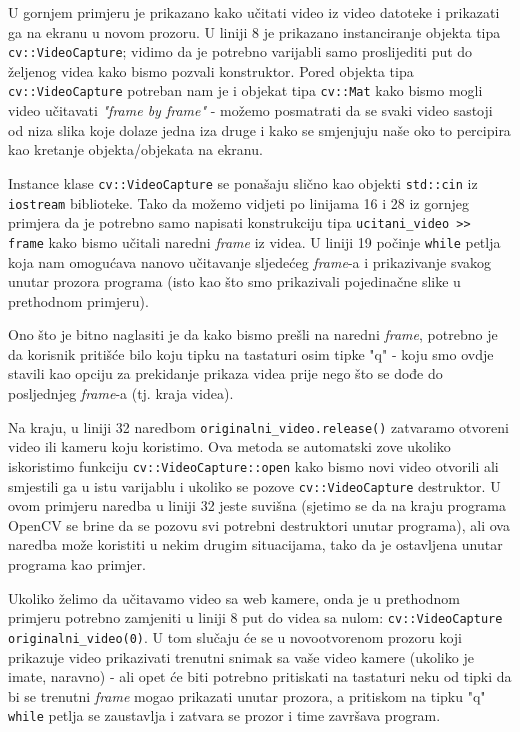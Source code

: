 \documentclass[a4paper, 12pt]{article}
\begin{document}
U gornjem primjeru je prikazano kako učitati video iz video datoteke i prikazati ga na ekranu u novom prozoru. U liniji 8 je prikazano instanciranje objekta tipa \lstinline{cv::VideoCapture}; vidimo da je potrebno varijabli samo proslijediti put do željenog videa kako bismo pozvali konstruktor. Pored objekta tipa \lstinline{cv::VideoCapture} potreban nam je i objekat tipa \lstinline{cv::Mat} kako bismo mogli video učitavati \textit{"frame by frame"} - možemo posmatrati da se svaki video sastoji od niza slika koje dolaze jedna iza druge i kako se smjenjuju naše oko to percipira kao kretanje objekta/objekata na ekranu. 

Instance klase \lstinline{cv::VideoCapture} se ponašaju slično kao objekti \lstinline{std::cin} iz \lstinline{iostream} biblioteke. Tako da možemo vidjeti po linijama 16 i 28 iz gornjeg primjera da je potrebno samo napisati konstrukciju tipa \lstinline{ucitani_video >> frame} kako bismo učitali naredni \textit{frame} iz videa. U liniji 19 počinje \lstinline{while} petlja koja nam omogućava nanovo učitavanje sljedećeg \textit{frame}-a i prikazivanje svakog unutar prozora programa (isto kao što smo prikazivali pojedinačne slike u prethodnom primjeru).

Ono što je bitno naglasiti je da kako bismo prešli na naredni \textit{frame}, potrebno je da korisnik pritišće bilo koju tipku na tastaturi osim tipke "q" - koju smo ovdje stavili kao opciju za prekidanje prikaza videa prije nego što se dođe do posljednjeg \textit{frame}-a (tj. kraja videa).

Na kraju, u liniji 32 naredbom \lstinline{originalni_video.release()} zatvaramo otvoreni video ili kameru koju koristimo. Ova metoda se automatski zove ukoliko iskoristimo funkciju \newline \lstinline{cv::VideoCapture::open} kako bismo novi video otvorili ali smjestili ga u istu varijablu i ukoliko se pozove \lstinline{cv::VideoCapture} destruktor. U ovom primjeru naredba u liniji 32 jeste suvišna (sjetimo se da na kraju programa OpenCV se brine da se pozovu svi potrebni destruktori unutar programa), ali ova naredba može koristiti u nekim drugim situacijama, tako da je ostavljena unutar programa kao primjer.

Ukoliko želimo da učitavamo video sa web kamere, onda je u prethodnom primjeru potrebno zamjeniti u liniji 8 put do videa sa nulom: \lstinline{cv::VideoCapture originalni_video(0)}. U tom slučaju će se u novootvorenom prozoru koji prikazuje video prikazivati trenutni snimak sa vaše video kamere (ukoliko je imate, naravno) - ali opet će biti potrebno pritiskati na tastaturi neku od tipki da bi se trenutni \textit{frame} mogao prikazati unutar prozora, a pritiskom na tipku "q" \lstinline{while} petlja se zaustavlja i zatvara se prozor i time završava program.
\end{document}
